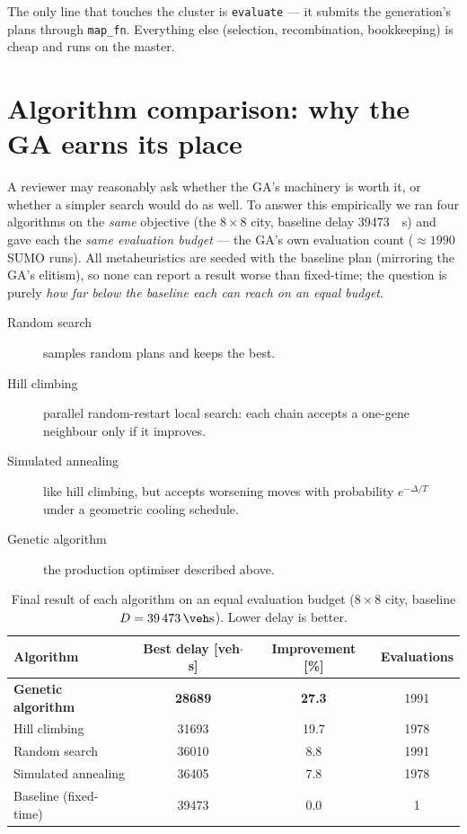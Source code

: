 \documentclass[11pt,a4paper]{article}
\begin{document}
\medskip
The only line that touches the cluster is \texttt{evaluate} --- it submits the
generation's plans through \texttt{map\_fn}. Everything else (selection,
recombination, bookkeeping) is cheap and runs on the master.

\section{Algorithm comparison: why the GA earns its place}
\label{sec:compare}
A reviewer may reasonably ask whether the GA's machinery is worth it, or whether
a simpler search would do as well. To answer this empirically we ran four
algorithms on the \emph{same} objective (the $8\times8$ city, baseline delay
\SI{39473}{\veh\second}) and gave each the \emph{same evaluation budget} --- the
GA's own evaluation count ($\approx1990$ SUMO runs). All metaheuristics are
seeded with the baseline plan (mirroring the GA's elitism), so none can report a
result worse than fixed-time; the question is purely \emph{how far below the
baseline each can reach on an equal budget}.

\begin{description}
  \item[Random search] samples random plans and keeps the best.
  \item[Hill climbing] parallel random-restart local search: each chain accepts
  a one-gene neighbour only if it improves.
  \item[Simulated annealing] like hill climbing, but accepts worsening moves
  with probability $e^{-\Delta/T}$ under a geometric cooling schedule.
  \item[Genetic algorithm] the production optimiser described above.
\end{description}

\begin{table}[H]
\centering
\caption{Final result of each algorithm on an equal evaluation budget
($8\times8$ city, baseline $D=\SI{39473}{\veh\second}$). Lower delay is better.}
\label{tab:compare}
\begin{tabular}{lS[table-format=5.0]S[table-format=2.1]S[table-format=4.0]}
\toprule
Algorithm & {Best delay [veh$\cdot$s]} & {Improvement [\%]} & {Evaluations} \\
\midrule
\textbf{Genetic algorithm} & \textbf{28689} & \textbf{27.3} & 1991 \\
Hill climbing              & 31693          & 19.7          & 1978 \\
Random search              & 36010          & 8.8           & 1991 \\
Simulated annealing        & 36405          & 7.8           & 1978 \\
\midrule
Baseline (fixed-time)      & 39473          & 0.0           & 1 \\
\bottomrule
\end{tabular}
\end{table}
\end{document}
